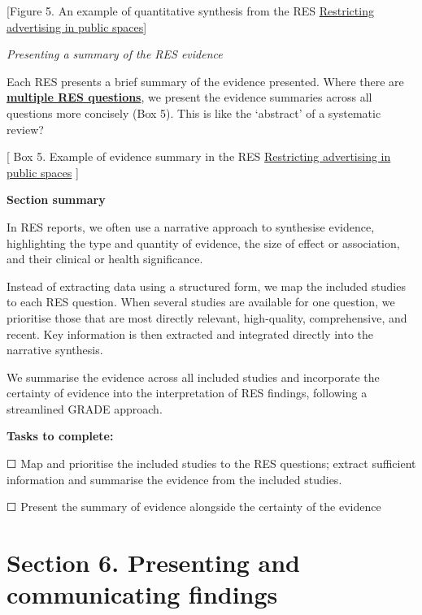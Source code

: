 \documentclass[
  letterpaper,
  DIV=11,
  numbers=noendperiod]{scrreprt}
\begin{document}
{[}Figure 5. An example of quantitative synthesis from the RES
\href{https://arc-gm.nihr.ac.uk/media/Resources/ARC/Evaluation/RES/Implementing\%20policies\%20that\%20restrict\%20the\%20use\%20of\%20outdoor\%20spaces\%20for\%20advertising\%20harmful\%20commodities/ARC-GM\%20RES\%20outdoor\%20advertising\%20harmful\%20commodities\%20revised.pdf}{Restricting
advertising in public spaces}{]}

\emph{Presenting a summary of the RES evidence}

Each RES presents a brief summary of the evidence presented. Where there
are \ul{\textbf{multiple RES questions}}, we present the evidence
summaries across all questions more concisely (Box 5). This is like the
`abstract' of a systematic review?

{[} Box 5. Example of evidence summary in the RES
\href{https://arc-gm.nihr.ac.uk/media/Resources/ARC/Evaluation/RES/Implementing\%20policies\%20that\%20restrict\%20the\%20use\%20of\%20outdoor\%20spaces\%20for\%20advertising\%20harmful\%20commodities/ARC-GM\%20RES\%20outdoor\%20advertising\%20harmful\%20commodities\%20revised.pdf}{Restricting
advertising in public spaces} {]}

\textbf{Section summary}

In RES reports, we often use a narrative approach to synthesise
evidence, highlighting the type and quantity of evidence, the size of
effect or association, and their clinical or health significance.

Instead of extracting data using a structured form, we map the included
studies to each RES question. When several studies are available for one
question, we prioritise those that are most directly relevant,
high-quality, comprehensive, and recent. Key information is then
extracted and integrated directly into the narrative synthesis.

We summarise the evidence across all included studies and incorporate
the certainty of evidence into the interpretation of RES findings,
following a streamlined GRADE approach.

\textbf{Tasks to complete:}

☐ Map and prioritise the included studies to the RES questions; extract
sufficient information and summarise the evidence from the included
studies.

☐ Present the summary of evidence alongside the certainty of the
evidence


\chapter{Section 6. Presenting and communicating
findings}\label{section-6.-presenting-and-communicating-findings}
\end{document}
